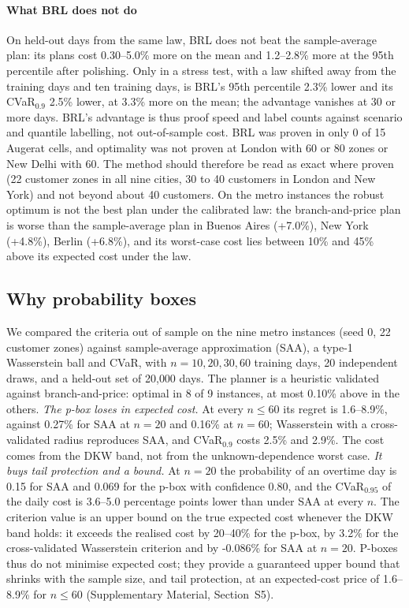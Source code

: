 \documentclass[preprint,11pt]{elsarticle}
\theoremstyle{definition}
\theoremstyle{remark}
\newcommand{\SM}[1]{Supplementary Material, Section~#1}
\begin{document}
\paragraph{What BRL does not do} On held-out days from the same law, BRL does not beat the sample-average plan: its plans cost 0.30--5.0\% more on the mean and 1.2--2.8\% more at the 95th percentile after polishing. Only in a stress test, with a law shifted away from the training days and ten training days, is BRL's 95th percentile 2.3\% lower and its CVaR$_{0.9}$ 2.5\% lower, at 3.3\% more on the mean; the advantage vanishes at 30 or more days. BRL's advantage is thus proof speed and label counts against scenario and quantile labelling, not out-of-sample cost. BRL was proven in only 0 of 15 Augerat cells, and optimality was not proven at London with 60 or 80 zones or New Delhi with 60. The method should therefore be read as exact where proven (22 customer zones in all nine cities, 30 to 40 customers in London and New York) and not beyond about 40 customers. On the metro instances the robust optimum is not the best plan under the calibrated law: the branch-and-price plan is worse than the sample-average plan in Buenos Aires (+7.0\%), New York (+4.8\%), Berlin (+6.8\%), and its worst-case cost lies between 10\% and 45\% above its expected cost under the law.

\subsection{Why probability boxes}\label{sec:res-pbox}

We compared the criteria out of sample on the nine metro instances (seed 0, 22 customer zones) against sample-average approximation (SAA), a type-1 Wasserstein ball and CVaR, with $n=10,20,30,60$ training days, 20 independent draws, and a held-out set of 20{,}000 days. The planner is a heuristic validated against branch-and-price: optimal in 8 of 9 instances, at most 0.10\% above in the others. \emph{The p-box loses in expected cost.} At every $n\le60$ its regret is 1.6--8.9\%, against 0.27\% for SAA at $n=20$ and 0.16\% at $n=60$; Wasserstein with a cross-validated radius reproduces SAA, and CVaR$_{0.9}$ costs 2.5\% and 2.9\%. The cost comes from the DKW band, not from the unknown-dependence worst case. \emph{It buys tail protection and a bound.} At $n=20$ the probability of an overtime day is 0.15 for SAA and 0.069 for the p-box with confidence 0.80, and the CVaR$_{0.95}$ of the daily cost is 3.6--5.0 percentage points lower than under SAA at every $n$. The criterion value is an upper bound on the true expected cost whenever the DKW band holds: it exceeds the realised cost by 20--40\% for the p-box, by 3.2\% for the cross-validated Wasserstein criterion and by -0.086\% for SAA at $n=20$. P-boxes thus do not minimise expected cost; they provide a guaranteed upper bound that shrinks with the sample size, and tail protection, at an expected-cost price of 1.6--8.9\% for $n\le60$ (\SM{S5}).
\end{document}
